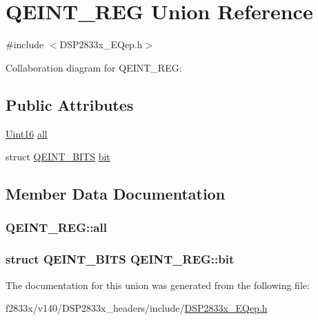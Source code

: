 \hypertarget{union_q_e_i_n_t___r_e_g}{}\section{Q\+E\+I\+N\+T\+\_\+\+R\+E\+G Union Reference}
\label{union_q_e_i_n_t___r_e_g}


{\ttfamily \#include $<$D\+S\+P2833x\+\_\+\+E\+Qep.\+h$>$}



Collaboration diagram for Q\+E\+I\+N\+T\+\_\+\+R\+E\+G\+:
\subsection*{Public Attributes}
\begin{DoxyCompactItemize}
\item 
\hyperlink{_d_s_p2833x___device_8h_a59a9f6be4562c327cbfb4f7e8e18f08b}{Uint16} \hyperlink{union_q_e_i_n_t___r_e_g_aebfe0b2c5c587a3f862c1fd6ea547e41}{all}
\item 
struct \hyperlink{struct_q_e_i_n_t___b_i_t_s}{Q\+E\+I\+N\+T\+\_\+\+B\+I\+T\+S} \hyperlink{union_q_e_i_n_t___r_e_g_a30eb5612365569ee69477cf24599233f}{bit}
\end{DoxyCompactItemize}


\subsection{Member Data Documentation}
\hypertarget{union_q_e_i_n_t___r_e_g_aebfe0b2c5c587a3f862c1fd6ea547e41}{}
\subsubsection[{all}]{ Q\+E\+I\+N\+T\+\_\+\+R\+E\+G\+::all}\label{union_q_e_i_n_t___r_e_g_aebfe0b2c5c587a3f862c1fd6ea547e41}
\hypertarget{union_q_e_i_n_t___r_e_g_a30eb5612365569ee69477cf24599233f}{}
\subsubsection[{bit}]{\setlength{\rightskip}{0pt plus 5cm}struct {\bf Q\+E\+I\+N\+T\+\_\+\+B\+I\+T\+S} Q\+E\+I\+N\+T\+\_\+\+R\+E\+G\+::bit}\label{union_q_e_i_n_t___r_e_g_a30eb5612365569ee69477cf24599233f}


The documentation for this union was generated from the following file\+:\begin{DoxyCompactItemize}
\item 
f2833x/v140/\+D\+S\+P2833x\+\_\+headers/include/\hyperlink{_d_s_p2833x___e_qep_8h}{D\+S\+P2833x\+\_\+\+E\+Qep.\+h}\end{DoxyCompactItemize}
